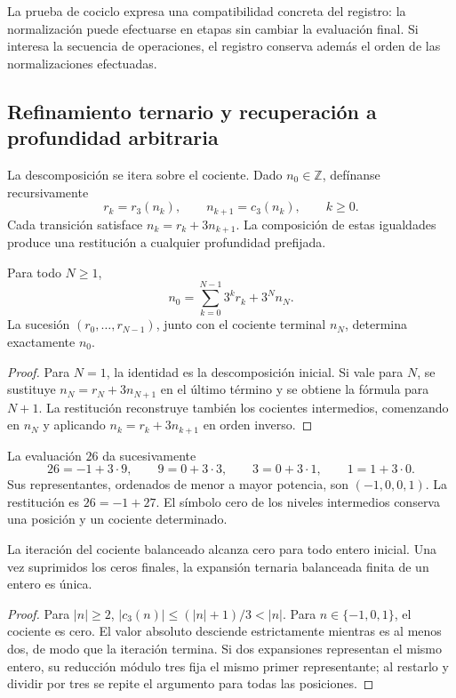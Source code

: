 La prueba de cociclo expresa una compatibilidad concreta del registro:
la normalización puede efectuarse en etapas sin cambiar la evaluación
final. Si interesa la secuencia de operaciones, el registro conserva
además el orden de las normalizaciones efectuadas.

\subsection{Refinamiento ternario y recuperación a profundidad arbitraria}
\label{trit:refinamiento}

La descomposición se itera sobre el cociente. Dado \(n_0\in\mathbb Z\),
defínanse recursivamente
\[
 r_k=r_3(n_k),\qquad n_{k+1}=c_3(n_k),\qquad k\ge0.
\]
Cada transición satisface \(n_k=r_k+3n_{k+1}\). La composición de estas
igualdades produce una restitución a cualquier profundidad prefijada.

\begin{proposicion}
\label{trit:prop:profundidad}
Para todo \(N\ge1\),
\begin{equation}
 n_0=\sum_{k=0}^{N-1}3^kr_k+3^Nn_N.
\label{trit:eq:restitucionN}
\end{equation}
La sucesión \((r_0,\ldots,r_{N-1})\), junto con el cociente terminal
\(n_N\), determina exactamente \(n_0\).
\end{proposicion}
\begin{proof}
Para \(N=1\), la identidad es la descomposición inicial. Si vale para
\(N\), se sustituye \(n_N=r_N+3n_{N+1}\) en el último término y se
obtiene la fórmula para \(N+1\). La restitución reconstruye también los
cocientes intermedios, comenzando en \(n_N\) y aplicando
\(n_k=r_k+3n_{k+1}\) en orden inverso.
\end{proof}

\begin{ejemplo}
La evaluación \(26\) da sucesivamente
\[
 26=-1+3\cdot9,\qquad 9=0+3\cdot3,
 \qquad 3=0+3\cdot1,\qquad1=1+3\cdot0.
\]
Sus representantes, ordenados de menor a mayor potencia, son
\((-1,0,0,1)\). La restitución es \(26=-1+27\). El símbolo cero de
los niveles intermedios conserva una posición y un cociente determinado.
\end{ejemplo}

\begin{proposicion}
La iteración del cociente balanceado alcanza cero para todo entero
inicial. Una vez suprimidos los ceros finales, la expansión ternaria
balanceada finita de un entero es única.
\end{proposicion}
\begin{proof}
Para \(|n|\ge2\),
\( |c_3(n)|\le(|n|+1)/3<|n|\).
Para \(n\in\{-1,0,1\}\), el cociente es cero. El valor absoluto
desciende estrictamente mientras es al menos dos, de modo que la
iteración termina. Si dos expansiones representan el mismo entero,
su reducción módulo tres fija el mismo primer representante; al restarlo
y dividir por tres se repite el argumento para todas las posiciones.
\end{proof}

